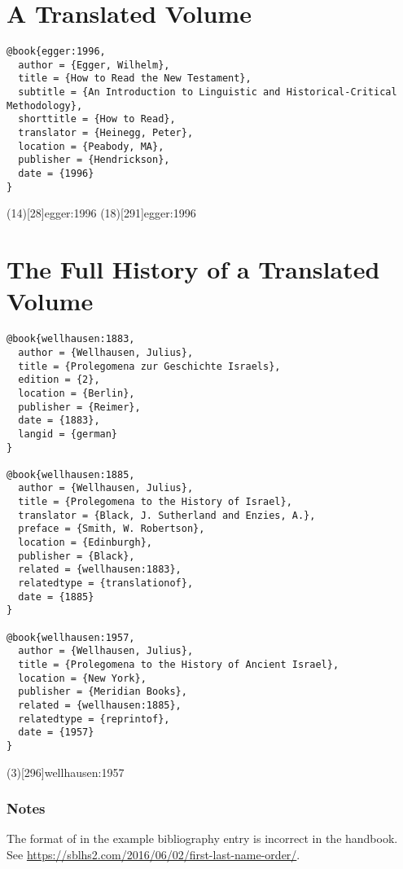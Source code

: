 \documentclass[a4paper]{article}
\begin{document}
\section{A Translated Volume}

\begin{verbatim}
@book{egger:1996,
  author = {Egger, Wilhelm},
  title = {How to Read the New Testament},
  subtitle = {An Introduction to Linguistic and Historical-Critical Methodology},
  shorttitle = {How to Read},
  translator = {Heinegg, Peter},
  location = {Peabody, MA},
  publisher = {Hendrickson},
  date = {1996}
}
\end{verbatim}

\examplecite(14)[28]{egger:1996}
\examplecite(18)[291]{egger:1996}
\examplebibliography

\section{The Full History of a Translated Volume}

\begin{verbatim}
@book{wellhausen:1883,
  author = {Wellhausen, Julius},
  title = {Prolegomena zur Geschichte Israels},
  edition = {2},
  location = {Berlin},
  publisher = {Reimer},
  date = {1883},
  langid = {german}
}

@book{wellhausen:1885,
  author = {Wellhausen, Julius},
  title = {Prolegomena to the History of Israel},
  translator = {Black, J. Sutherland and Enzies, A.},
  preface = {Smith, W. Robertson},
  location = {Edinburgh},
  publisher = {Black},
  related = {wellhausen:1883},
  relatedtype = {translationof},
  date = {1885}
}

@book{wellhausen:1957,
  author = {Wellhausen, Julius},
  title = {Prolegomena to the History of Ancient Israel},
  location = {New York},
  publisher = {Meridian Books},
  related = {wellhausen:1885},
  relatedtype = {reprintof},
  date = {1957}
}
\end{verbatim}

\examplecite(3)[296]{wellhausen:1957}
\examplebibliography

\subsubsection{Notes}

The format of  in the example bibliography
entry is incorrect in the handbook. See
\url{https://sblhs2.com/2016/06/02/first-last-name-order/}.
\end{document}
